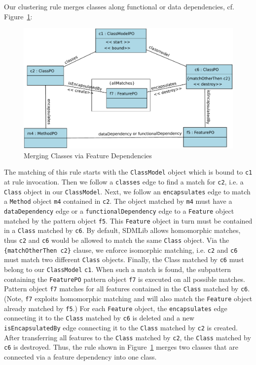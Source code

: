 \documentclass[submission,copyright,creativecommons]{eptcs}
\begin{document}
Our clustering rule merges classes along functional or data dependencies, 
cf. Figure~\ref{fig:MergeAttributeRule}: 

\begin{figure}[ht] \centering
	\includegraphics[width=\linewidth]{images/RuleMergeDep.pdf}
 \caption{Merging Classes via Feature Dependencies}
 \label{fig:MergeAttributeRule}
\end{figure}  

The matching of this rule starts with the \texttt{ClassModel} object which 
is bound to \texttt{c1} at rule invocation. Then we follow a \texttt{classes}
 edge to find a match for \texttt{c2}, i.e. a \texttt{Class} object in our 
\texttt{ClassModel}. Next, we follow an \texttt{encapsulates} edge to match 
a \texttt{Method} object \texttt{m4} contained in \texttt{c2}. The object 
matched by \texttt{m4} must have a \texttt{dataDependency} edge 
or a \texttt{functionalDependency} edge to a \texttt{Feature} object 
matched by the pattern object \texttt{f5}. This 
\texttt{Feature} object in turn must be contained in a \texttt{Class} matched by 
\texttt{c6}. By default, SDMLib allows homomorphic matches, thus \texttt{c2} 
and \texttt{c6} would be allowed to match the same \texttt{Class} object. 
Via the \texttt{\{matchOtherThen c2\}} clause, we enforce isomorphic 
matching, i.e. \texttt{c2} and \texttt{c6} must match two different 
\texttt{Class} objects. Finally, the Class matched by \texttt{c6} must belong to our 
\texttt{ClassModel} \texttt{c1}. When such a match is found, the subpattern 
containing the \texttt{FeaturePO} pattern object \texttt{f7} is executed on 
all possible matches. Pattern object \texttt{f7} matches for all features 
contained in the \texttt{Class} matched by \texttt{c6}. (Note, \texttt{f7} 
exploits homomorphic matching and will also match the \texttt{Feature} 
object already matched by \texttt{f5}.) For each \texttt{Feature} object, 
the \texttt{encapsulates} edge connecting it to the \texttt{Class} matched 
by \texttt{c6} is deleted and a new \texttt{isEncapsulatedBy} edge 
connecting it to the \texttt{Class} matched by \texttt{c2} is created. After 
transferring all features to the \texttt{Class} matched by \texttt{c2}, the 
\texttt{Class} matched by \texttt{c6} is destroyed. Thus, the rule shown in 
Figure~\ref{fig:MergeAttributeRule} merges two classes that are connected 
via a feature dependency into one class. 
\end{document}
